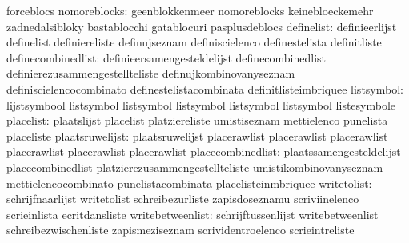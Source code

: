                                   forceblocs
                    nomoreblocks: geenblokkenmeer                  nomoreblocks
                                  keinebloeckemehr                 zadnedalsibloky
                                  bastablocchi                     gatablocuri
                                  pasplusdeblocs
                      definelist: definieerlijst                   definelist
                                  definiereliste                   definujseznam
                                  definiscielenco                  definestelista
                                  definitliste
              definecombinedlist: definieersamengesteldelijst      definecombinedlist
                                  definierezusammengestellteliste  definujkombinovanyseznam
                                  definiscielencocombinato         definestelistacombinata
                                  definitlisteimbriquee
                      listsymbol: lijstsymbool                     listsymbol
                                  listsymbol                       listsymbol
                                  listsymbol                       listsymbol
                                  listesymbole
                       placelist: plaatslijst                      placelist
                                  platziereliste                   umistiseznam
                                  mettielenco                      punelista
                                  placeliste
                 plaatsruwelijst: plaatsruwelijst                  placerawlist
                                  placerawlist                     placerawlist
                                  placerawlist                     placerawlist
                                  placerawlist
               placecombinedlist: plaatssamengesteldelijst         placecombinedlist
                                  platzierezusammengestellteliste  umistikombinovanyseznam
                                  mettielencocombinato             punelistacombinata
                                  placelisteinmbriquee
                     writetolist: schrijfnaarlijst                 writetolist
                                  schreibezurliste                 zapisdoseznamu
                                  scriviinelenco                   scrieinlista
                                  ecritdansliste
                writebetweenlist: schrijftussenlijst               writebetweenlist
                                  schreibezwischenliste            zapismeziseznam
                                  scrividentroelenco               scrieintreliste
